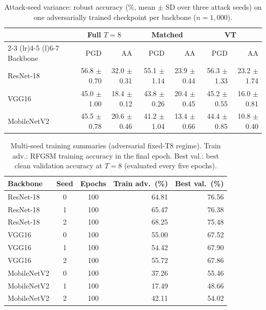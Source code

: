 \begin{table}[htbp]
\centering
\caption[Attack-seed variance]{Attack-seed variance: robust accuracy (\%, mean $\pm$ SD over three attack seeds) on one adversarially trained checkpoint per backbone ($n = 1{,}000$).}
\label{tab:app-attack-seed}
\footnotesize
\begin{tabular}{@{}l rr rr rr@{}}
\toprule
& \multicolumn{2}{c}{Full $T{=}8$} & \multicolumn{2}{c}{Matched} & \multicolumn{2}{c}{VT} \\
\cmidrule(lr){2-3} \cmidrule(lr){4-5} \cmidrule(l){6-7}
Backbone & PGD & AA & PGD & AA & PGD & AA \\
\midrule
ResNet-18 & 56.8 $\pm$ 0.70 & 32.0 $\pm$ 0.31 & 55.1 $\pm$ 1.14 & 23.9 $\pm$ 0.44 & 56.3 $\pm$ 1.33 & 23.2 $\pm$ 1.74 \\
VGG16 & 45.0 $\pm$ 1.00 & 18.4 $\pm$ 0.12 & 43.8 $\pm$ 0.26 & 20.4 $\pm$ 0.45 & 45.2 $\pm$ 0.55 & 16.0 $\pm$ 0.81 \\
MobileNetV2 & 45.5 $\pm$ 0.78 & 20.6 $\pm$ 0.46 & 41.2 $\pm$ 1.04 & 13.4 $\pm$ 0.66 & 44.4 $\pm$ 0.85 & 10.8 $\pm$ 0.40 \\
\bottomrule
\end{tabular}
\end{table}

\begin{table}[htbp]
\centering
\caption[Multi-seed training summaries]{Multi-seed training summaries (adversarial fixed-T8 regime). Train adv.: RFGSM training accuracy in the final epoch. Best val.: best clean validation accuracy at $T = 8$ (evaluated every five epochs).}
\label{tab:app-train}
\footnotesize
\begin{tabular}{@{}l c c r r@{}}
\toprule
Backbone & Seed & Epochs & Train adv.\ (\%) & Best val.\ (\%) \\
\midrule
ResNet-18 & 0 & 100 & 64.81 & 76.56 \\
ResNet-18 & 1 & 100 & 65.47 & 76.38 \\
ResNet-18 & 2 & 100 & 68.25 & 75.48 \\
VGG16 & 0 & 100 & 55.00 & 67.52 \\
VGG16 & 1 & 100 & 54.42 & 67.90 \\
VGG16 & 2 & 100 & 55.72 & 67.86 \\
MobileNetV2 & 0 & 100 & 37.26 & 55.46 \\
MobileNetV2 & 1 & 100 & 17.49 & 48.66 \\
MobileNetV2 & 2 & 100 & 42.11 & 54.02 \\
\bottomrule
\end{tabular}
\end{table}

